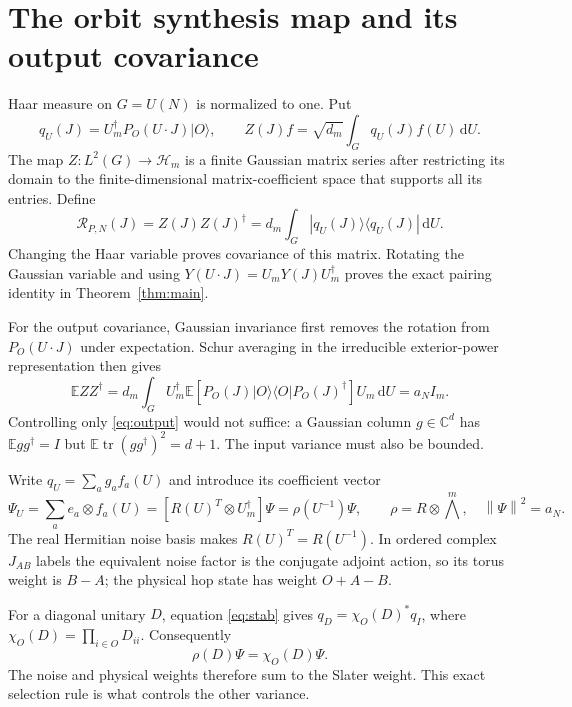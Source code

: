 \documentclass[11pt]{article}
\newcommand{\E}{\mathbb E}
\newcommand{\tr}{\operatorname{tr}}
\newcommand{\HH}{\mathcal H}
\newcommand{\dd}{\mathrm d}
\newcommand{\norm}[1]{\left\lVert#1\right\rVert}
\begin{document}
\newpage
\section{The orbit synthesis map and its output covariance}
Haar measure on $G=U(N)$ is normalized to one. Put
\begin{equation}
 q_U(J)=U_m^\dagger P_O(U\cdot J)|O\rangle,\qquad
 Z(J)f=\sqrt{d_m}\int_G q_U(J)f(U)\,\dd U.
\end{equation}
The map $Z:L^2(G)\to\HH_m$ is a finite Gaussian matrix series after
restricting its domain to the finite-dimensional matrix-coefficient
space that supports all its entries. Define
\begin{equation}\label{eq:density}
 \mathcal R_{P,N}(J)=Z(J)Z(J)^\dagger
     =d_m\int_G |q_U(J)\rangle\langle q_U(J)|\,\dd U.
\end{equation}
Changing the Haar variable proves covariance of this matrix. Rotating
the Gaussian variable and using $Y(U\cdot J)=U_mY(J)U_m^\dagger$
proves the exact pairing identity in Theorem~\ref{thm:main}.

For the output covariance, Gaussian invariance first removes the
rotation from $P_O(U\cdot J)$ under expectation. Schur averaging
in the irreducible exterior-power representation then gives
\begin{equation}\label{eq:output}
 \E ZZ^\dagger
 =d_m\int_G U_m^\dagger
    \E[P_O(J)|O\rangle\langle O|P_O(J)^\dagger]U_m\,\dd U
 =a_N I_m.
\end{equation}
Controlling only \eqref{eq:output} would not suffice: a Gaussian
column $g\in\mathbb C^d$ has $\E gg^\dagger=I$ but
$\E\tr(gg^\dagger)^2=d+1$. The input variance must also be bounded.

Write $q_U=\sum_a g_a f_a(U)$ and introduce its coefficient vector
\begin{equation}
 \Psi_U=\sum_a e_a\otimes f_a(U)
     =[R(U)^T\otimes U_m^\dagger]\Psi
     =\rho(U^{-1})\Psi,\qquad
 \rho=R\otimes\bigwedge^m,\quad \norm\Psi^2=a_N.
\end{equation}
The real Hermitian noise basis makes $R(U)^T=R(U^{-1})$.
In ordered complex $J_{AB}$ labels the equivalent noise factor is
the conjugate adjoint action, so its torus weight is $B-A$;
the physical hop state has weight $O+A-B$.

For a diagonal unitary $D$, equation \eqref{eq:stab} gives
$q_D=\chi_O(D)^*q_I$, where $\chi_O(D)=\prod_{i\in O}D_{ii}$.
Consequently
\begin{equation}\label{eq:weight}
 \rho(D)\Psi=\chi_O(D)\Psi.
\end{equation}
The noise and physical weights therefore sum to the Slater weight.
This exact selection rule is what controls the other variance.
\end{document}
